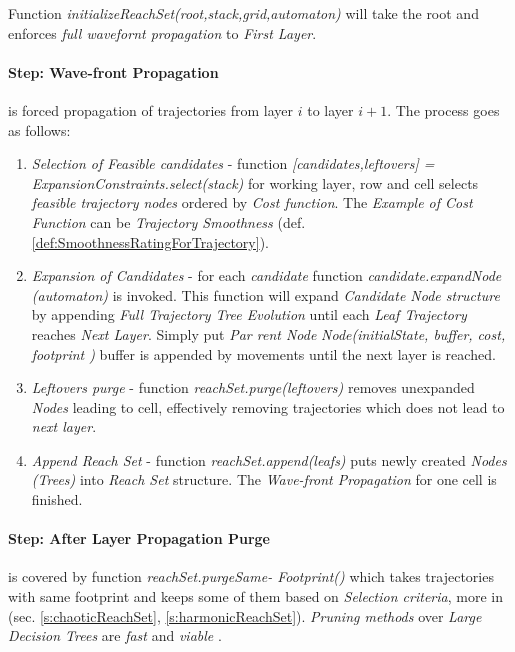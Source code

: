 Function \emph{initializeReachSet(root,stack,grid,automaton)} will take the root and enforces \emph{full wavefornt propagation} to \emph{First Layer}.

\paragraph{Step: Wave-front Propagation} is forced propagation of trajectories from layer $i$ to layer $i+1$. The process goes as follows:
\begin{enumerate}
    \item \emph{Selection of Feasible candidates} - function \emph{[candidates,leftovers] = ExpansionConstraints.select(stack)} for working layer, row and cell selects \emph{feasible trajectory nodes} ordered by \emph{Cost function}. The \emph{Example of Cost Function} can be \emph{Trajectory Smoothness} (def. \ref{def:SmoothnessRatingForTrajectory}).
    
    \item \emph{Expansion of Candidates} - for each \emph{candidate} function \emph{candidate.expandNode (automaton)} is invoked. This function will expand \emph{Candidate Node structure} by appending \emph{Full Trajectory Tree Evolution} until each \emph{Leaf Trajectory} reaches \emph{Next Layer}. Simply put \emph{Par rent Node} \emph{Node(initialState, buffer, cost, footprint )} buffer is appended by movements until the next layer is reached.
    
    \item \emph{Leftovers purge} - function \emph{reachSet.purge(leftovers)} removes unexpanded \emph{Nodes} leading to cell, effectively  removing trajectories which does not  lead to \emph{next layer}.
    
    \item \emph{Append Reach Set} - function \emph{reachSet.append(leafs)} puts newly created \emph{Nodes (Trees)} into \emph{Reach Set} structure. The \emph{Wave-front Propagation} for one cell is finished.
\end{enumerate}

\paragraph{Step: After Layer Propagation Purge} is covered by function \emph{reachSet.purgeSame- Footprint()} which takes trajectories with same footprint and keeps some of them based on \emph{Selection criteria}, more in (sec. \ref{s:chaoticReachSet}, \ref{s:harmonicReachSet}). \emph{Pruning methods} over \emph{Large Decision Trees} are \emph{fast} and \emph{viable} \cite{mingers1989empirical}.


